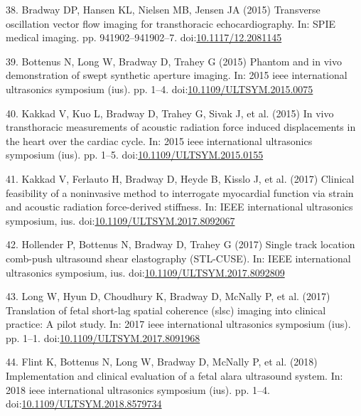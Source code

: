 \documentclass[
]{article}
\newenvironment{cslreferences}%
  {}%
  {\par}
\begin{document}
\begin{cslreferences}
\leavevmode\hypertarget{ref-Bradway2015}{}%
38. Bradway DP, Hansen KL, Nielsen MB, Jensen JA (2015) Transverse
oscillation vector flow imaging for transthoracic echocardiography. In:
SPIE medical imaging. pp. 941902--941902--7.
doi:\href{https://doi.org/10.1117/12.2081145}{10.1117/12.2081145}

\leavevmode\hypertarget{ref-Bottenus2015}{}%
39. Bottenus N, Long W, Bradway D, Trahey G (2015) Phantom and in vivo
demonstration of swept synthetic aperture imaging. In: 2015 ieee
international ultrasonics symposium (ius). pp. 1--4.
doi:\href{https://doi.org/10.1109/ULTSYM.2015.0075}{10.1109/ULTSYM.2015.0075}

\leavevmode\hypertarget{ref-Kakkad2015}{}%
40. Kakkad V, Kuo L, Bradway D, Trahey G, Sivak J, et al. (2015) In vivo
transthoracic measurements of acoustic radiation force induced
displacements in the heart over the cardiac cycle. In: 2015 ieee
international ultrasonics symposium (ius). pp. 1--5.
doi:\href{https://doi.org/10.1109/ULTSYM.2015.0155}{10.1109/ULTSYM.2015.0155}

\leavevmode\hypertarget{ref-Kakkad2017}{}%
41. Kakkad V, Ferlauto H, Bradway D, Heyde B, Kisslo J, et al. (2017)
Clinical feasibility of a noninvasive method to interrogate myocardial
function via strain and acoustic radiation force-derived stiffness. In:
IEEE international ultrasonics symposium, ius.
doi:\href{https://doi.org/10.1109/ULTSYM.2017.8092067}{10.1109/ULTSYM.2017.8092067}

\leavevmode\hypertarget{ref-Hollender2017}{}%
42. Hollender P, Bottenus N, Bradway D, Trahey G (2017) Single track
location comb-push ultrasound shear elastography (STL-CUSE). In: IEEE
international ultrasonics symposium, ius.
doi:\href{https://doi.org/10.1109/ULTSYM.2017.8092809}{10.1109/ULTSYM.2017.8092809}

\leavevmode\hypertarget{ref-Long2017IUS}{}%
43. Long W, Hyun D, Choudhury K, Bradway D, McNally P, et al. (2017)
Translation of fetal short-lag spatial coherence (slsc) imaging into
clinical practice: A pilot study. In: 2017 ieee international
ultrasonics symposium (ius). pp. 1--1.
doi:\href{https://doi.org/10.1109/ULTSYM.2017.8091968}{10.1109/ULTSYM.2017.8091968}

\leavevmode\hypertarget{ref-Flint2018}{}%
44. Flint K, Bottenus N, Long W, Bradway D, McNally P, et al. (2018)
Implementation and clinical evaluation of a fetal alara ultrasound
system. In: 2018 ieee international ultrasonics symposium (ius). pp.
1--4.
doi:\href{https://doi.org/10.1109/ULTSYM.2018.8579734}{10.1109/ULTSYM.2018.8579734}
\end{cslreferences}
\end{document}
